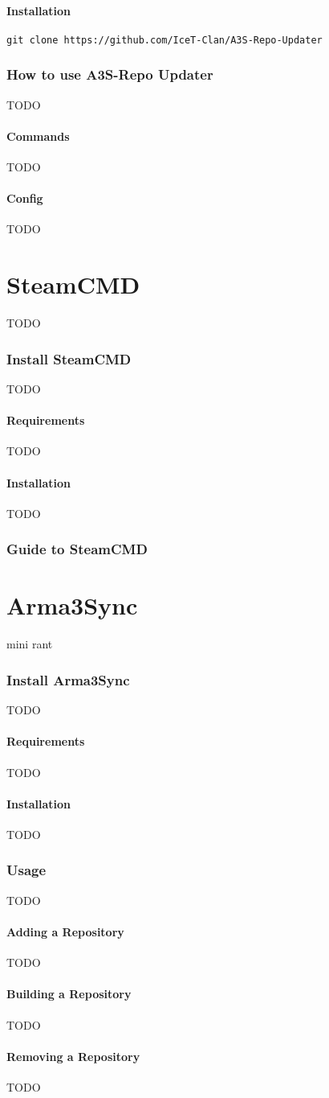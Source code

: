 \documentclass[a4paper]{article}
\begin{document}
			\subsection{Installation}
				\lstset{language=sh}
				\begin{lstlisting}
git clone https://github.com/IceT-Clan/A3S-Repo-Updater
				\end{lstlisting}
	
		\section{How to use A3S-Repo Updater}
			TODO
			\subsection{Commands}
				TODO
			\subsection{Config}
				TODO
	\newpage
	
	\part{SteamCMD}
		TODO
		\section{Install SteamCMD}
			TODO
			\subsection{Requirements}
				TODO
			\subsection{Installation}
				TODO
		\section{Guide to SteamCMD}
	\newpage
	
	\part{Arma3Sync}
		mini rant
		\section{Install Arma3Sync}
			TODO
			\subsection{Requirements}
				TODO
			\subsection{Installation}
				TODO
		\section{Usage}
			TODO
			\subsection{Adding a Repository}
				TODO
			\subsection{Building a Repository}
				TODO
			\subsection{Removing a Repository}
				TODO
\end{document}
